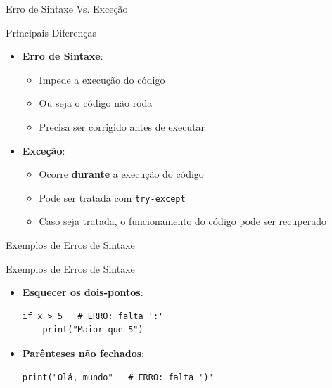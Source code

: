 \begin{frame}{Erro de Sintaxe Vs. Exceção}
    \begin{alertblock}{Principais Diferenças}
        \begin{itemize}
            \item \textbf{Erro de Sintaxe}:
                  \begin{itemize}
                      \item Impede a execução do código
                      \item Ou seja o código não roda
                      \item Precisa ser corrigido antes de executar
                  \end{itemize}

            \item \textbf{Exceção}:
                  \begin{itemize}
                      \item Ocorre \textbf{durante} a execução do código
                      \item Pode ser tratada com \texttt{try-except}
                      \item Caso seja tratada, o funcionamento do código pode ser recuperado
                  \end{itemize}
        \end{itemize}
    \end{alertblock}
\end{frame}



\begin{frame}[fragile]{Exemplos de Erros de Sintaxe}

    \begin{exampleblock}{Exemplos de Erros de Sintaxe}
        \begin{itemize}
            \item \textbf{Esquecer os dois-pontos}:
                  \begin{verbatim}
if x > 5   # ERRO: falta ':'
    print("Maior que 5")
            \end{verbatim}

            \item \textbf{Parênteses não fechados}:
                  \begin{verbatim}
print("Olá, mundo"   # ERRO: falta ')'
            \end{verbatim}


        \end{itemize}
    \end{exampleblock}


\end{frame}


